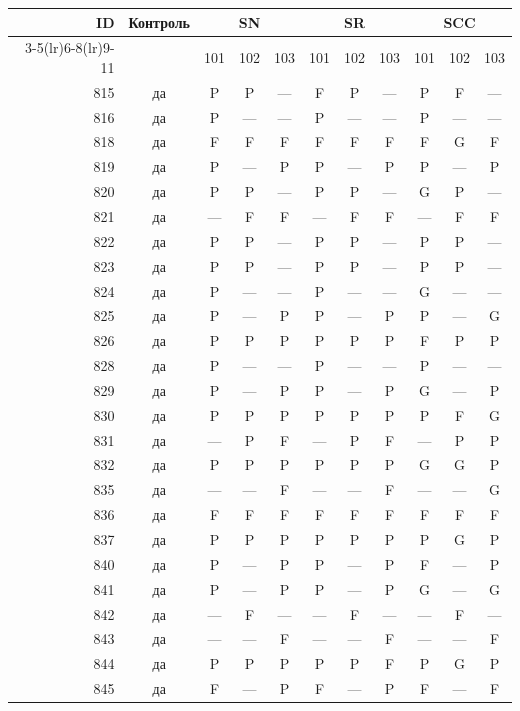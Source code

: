 \begin{table}[p]\centering\small
\begin{tabular*}{\textwidth}{@{\extracolsep{\fill}}rc*{9}{c}@{}}\toprule
ID & Контроль & \multicolumn{3}{c}{SN} & \multicolumn{3}{c}{SR} & \multicolumn{3}{c}{SCC}\\
\cmidrule(lr){3-5}\cmidrule(lr){6-8}\cmidrule(lr){9-11}
 & & 101 & 102 & 103 & 101 & 102 & 103 & 101 & 102 & 103\\\midrule
815 & да & P & P & — & F & P & — & P & F & —\\
816 & да & P & — & — & P & — & — & P & — & —\\
818 & да & F & F & F & F & F & F & F & G & F\\
819 & да & P & — & P & P & — & P & P & — & P\\
820 & да & P & P & — & P & P & — & G & P & —\\
821 & да & — & F & F & — & F & F & — & F & F\\
822 & да & P & P & — & P & P & — & P & P & —\\
823 & да & P & P & — & P & P & — & P & P & —\\
824 & да & P & — & — & P & — & — & G & — & —\\
825 & да & P & — & P & P & — & P & P & — & G\\
826 & да & P & P & P & P & P & P & F & P & P\\
828 & да & P & — & — & P & — & — & P & — & —\\
829 & да & P & — & P & P & — & P & G & — & P\\
830 & да & P & P & P & P & P & P & P & F & G\\
831 & да & — & P & F & — & P & F & — & P & P\\
832 & да & P & P & P & P & P & P & G & G & P\\
835 & да & — & — & F & — & — & F & — & — & G\\
836 & да & F & F & F & F & F & F & F & F & F\\
837 & да & P & P & P & P & P & P & P & G & P\\
840 & да & P & — & P & P & — & P & F & — & P\\
841 & да & P & — & P & P & — & P & G & — & G\\
842 & да & — & F & — & — & F & — & — & F & —\\
843 & да & — & — & F & — & — & F & — & — & F\\
844 & да & P & P & P & P & P & F & P & G & P\\
845 & да & F & — & P & F & — & P & F & — & F\\

\end{tabular*}
\end{table}
